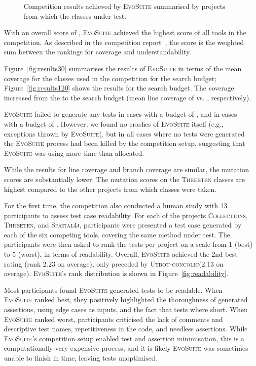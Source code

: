\documentclass[10pt,conference]{IEEEtran}
\newcommand{\project}[1]{\textsc{#1}\xspace}
\newcommand{\Collections}{\project{Collections}}
\newcommand{\Threeten}{\project{Threeten}}
\newcommand{\Spatial}{\project{Spatial4j}}
\newcommand{\EVOSUITE}{\textsc{EvoSuite}\xspace}
\newcommand{\UtbotConcolic}{\textsc{Utbot-concolic}\xspace}
\begin{document}
\begin{figure}
  \caption{Competition results achieved by \EVOSUITE summarised by projects from which the classes under test.}
  \label{fig:figures}
\end{figure}


With an overall score of \score, \EVOSUITE achieved the highest score of all
tools in the competition. As described in the competition
report~\cite{SBST-toolcomp22}, the score is the weighted sum between the
rankings for coverage and understandability.

Figure~\ref{fig:results30} summarises the results of \EVOSUITE in terms of the
mean coverage for the \cuts classes used in the competition for the \budgetShort search budget; Figure~\ref{fig:results120} shows the results for the \budgetLong search budget. The coverage
increased from the \budgetShort to the \budgetLong search budget (mean line
coverage of \avgLinesCoverageRatioShort vs. \avgLinesCoverageRatioLong, respectively).

\EVOSUITE failed to generate any tests in \numTestGenFailedShort cases with a
budget of \budgetShort, and in \numTestGenFailedLong cases with a budget of
\budgetLong. However, we found no crashes of \EVOSUITE itself (e.g., exceptions
thrown by \EVOSUITE), but in all cases where no tests were generated the
\EVOSUITE process had been killed by the competition setup, suggesting that
\EVOSUITE was using more time than allocated.

While the results for line coverage and branch coverage are similar, the
mutation scores are substantially lower. The mutation scores on the \Threeten
classes are highest compared to the other projects from which classes were taken.

For the first time, the competition also conducted a human study with 13
participants to assess test case readability. For each of the projects \Collections,
\Threeten, and \Spatial, participants were presented a test case
generated by each of the six competing tools, covering the same method under
test. The participants were then asked to rank the tests per project
on a scale from 1 (best) to 5 (worst), in terms of readability. Overall,
\EVOSUITE achieved the 2nd best rating (rank 2.23 on average), only
preceded by \UtbotConcolic (2.13 on average). \EVOSUITE's rank distribution
is shown in Figure~\ref{fig:readability}.

Most participants found \EVOSUITE-generated tests to be readable. When
\EVOSUITE ranked best, they positively highlighted the thoroughness of
generated assertions, using edge cases as inputs, and the fact that tests
where short. When \EVOSUITE ranked worst, participants criticised the lack
of comments and descriptive test names, repetitiveness in the code, and
needless assertions. While \EVOSUITE's competition setup enabled test and
assertion minimisation, this is a computationally very expensive process,
and it is likely \EVOSUITE was sometimes unable to finish in time,
leaving tests unoptimised.
\end{document}
